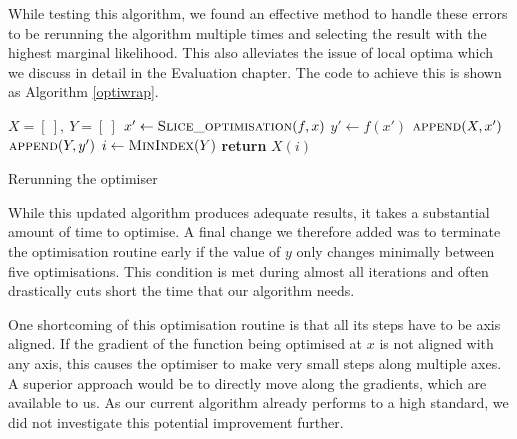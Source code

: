 \documentclass[a4paper,12pt,twoside,openright]{report}
\begin{document}
While testing this algorithm, we found an effective method to handle these errors to be rerunning the algorithm multiple times and selecting the result with the highest marginal likelihood. This also alleviates the issue of local optima which we discuss in detail in the Evaluation chapter. The code to achieve this is shown as Algorithm \ref{optiwrap}.

\begin{algorithm}
\begin{algorithmic}[1]
\State $X = [\ ],\ Y = [\ ]$
\State $x'\gets \Call{Slice\_optimisation}{f, x}$
\State $y'\gets f(x')$
\State $\Call{append}{X, x'}$
\State $\Call{append}{Y, y'}$
\EndFor
\State $i\gets \Call{MinIndex}{Y}$
\State \textbf{return} $X(i)$
\EndProcedure
\end{algorithmic}
\caption{Rerunning the optimiser}
\label{optiwrap}
\end{algorithm}

While this updated algorithm produces adequate results, it takes a substantial amount of time to optimise. A final change we therefore added was to terminate the optimisation routine early if the value of $y$ only changes minimally between five optimisations. This condition is met during almost all iterations and often drastically cuts short the time that our algorithm needs.

One shortcoming of this optimisation routine is that all its steps have to be axis aligned. If the gradient of the function being optimised at $x$ is not aligned with any axis, this causes the optimiser to make very small steps along multiple axes. A superior approach would be to directly move along the gradients, which are available to us. As our current algorithm already performs to a high standard, we did not investigate this potential improvement further.




\end{document}
